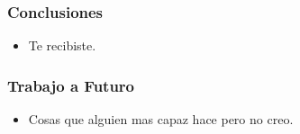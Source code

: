 \begin{frame}
	\frametitle{Conclusiones}
	\begin{itemize}
		\item Te recibiste.
	\end{itemize}
\end{frame}

\begin{frame}
	\frametitle{Trabajo a Futuro}
	\begin{itemize}
		\item Cosas que alguien mas capaz hace pero no creo.
	\end{itemize}
\end{frame}
